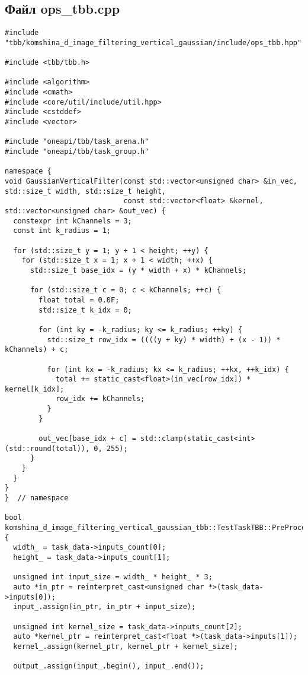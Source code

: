 \documentclass[12pt]{article}
\begin{document}
\subsection*{Файл ops\_tbb.cpp}
\begin{lstlisting}
#include "tbb/komshina_d_image_filtering_vertical_gaussian/include/ops_tbb.hpp"

#include <tbb/tbb.h>

#include <algorithm>
#include <cmath>
#include <core/util/include/util.hpp>
#include <cstddef>
#include <vector>

#include "oneapi/tbb/task_arena.h"
#include "oneapi/tbb/task_group.h"

namespace {
void GaussianVerticalFilter(const std::vector<unsigned char> &in_vec, std::size_t width, std::size_t height,
                            const std::vector<float> &kernel, std::vector<unsigned char> &out_vec) {
  constexpr int kChannels = 3;
  const int k_radius = 1;

  for (std::size_t y = 1; y + 1 < height; ++y) {
    for (std::size_t x = 1; x + 1 < width; ++x) {
      std::size_t base_idx = (y * width + x) * kChannels;

      for (std::size_t c = 0; c < kChannels; ++c) {
        float total = 0.0F;
        std::size_t k_idx = 0;

        for (int ky = -k_radius; ky <= k_radius; ++ky) {
          std::size_t row_idx = ((((y + ky) * width) + (x - 1)) * kChannels) + c;

          for (int kx = -k_radius; kx <= k_radius; ++kx, ++k_idx) {
            total += static_cast<float>(in_vec[row_idx]) * kernel[k_idx];
            row_idx += kChannels;
          }
        }

        out_vec[base_idx + c] = std::clamp(static_cast<int>(std::round(total)), 0, 255);
      }
    }
  }
}
}  // namespace

bool komshina_d_image_filtering_vertical_gaussian_tbb::TestTaskTBB::PreProcessingImpl() {
  width_ = task_data->inputs_count[0];
  height_ = task_data->inputs_count[1];

  unsigned int input_size = width_ * height_ * 3;
  auto *in_ptr = reinterpret_cast<unsigned char *>(task_data->inputs[0]);
  input_.assign(in_ptr, in_ptr + input_size);

  unsigned int kernel_size = task_data->inputs_count[2];
  auto *kernel_ptr = reinterpret_cast<float *>(task_data->inputs[1]);
  kernel_.assign(kernel_ptr, kernel_ptr + kernel_size);

  output_.assign(input_.begin(), input_.end());


\end{lstlisting}
\end{document}
